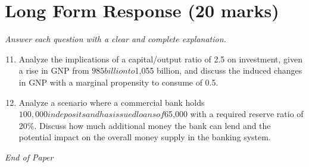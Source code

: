 \documentclass[12pt]{article}
\begin{document}
\section*{Long Form Response (20 marks)}
\textit{Answer each question with a clear and complete explanation.}
\begin{enumerate}[label=\arabic*.]
\setcounter{enumi}{10}
\item Analyze the implications of a capital/output ratio of 2.5 on investment, given a rise in GNP from $985 billion to $1,055 billion, and discuss the induced changes in GNP with a marginal propensity to consume of 0.5.
\item Analyze a scenario where a commercial bank holds $100,000 in deposits and has issued loans of $65,000 with a required reserve ratio of 20\%. Discuss how much additional money the bank can lend and the potential impact on the overall money supply in the banking system.
\end{enumerate}

\vfill
\noindent\textit{End of Paper}
\end{document}
